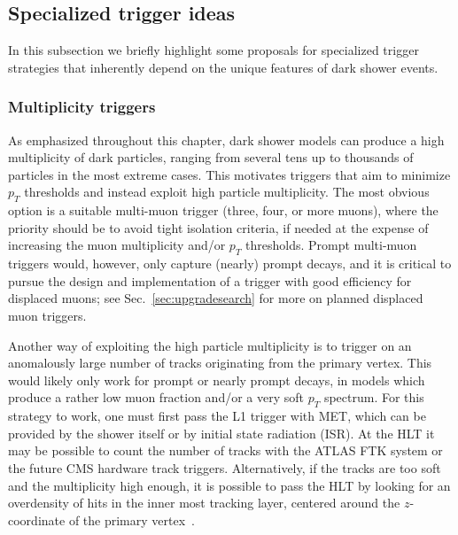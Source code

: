 \begin{enumerate}
\begin{enumerate}
\end{enumerate}



\subsection{Specialized trigger ideas}

In this subsection we briefly highlight some proposals for specialized trigger strategies that inherently depend on the unique features of dark shower events.


\subsubsection{Multiplicity triggers}
\label{sec:darkshowertrigmultiplicity}

As emphasized  throughout this chapter, dark shower models can produce a high multiplicity of dark particles, ranging from several tens up to thousands of particles in the most extreme cases. This motivates triggers that aim to minimize $p_T$ thresholds and instead exploit high particle multiplicity. The most obvious option is a suitable multi-muon trigger (three, four, or more muons), where the priority should be to avoid tight isolation criteria, if needed at the expense of increasing the muon multiplicity and/or $p_T$ thresholds. Prompt multi-muon triggers would, however, only capture (nearly) prompt decays, and it is critical to pursue the design and implementation of a trigger with good efficiency for displaced muons; see Sec.~\ref{sec:upgradesearch} for more on planned displaced muon triggers.


Another way of exploiting the high particle multiplicity is to trigger on an anomalously large number of tracks originating from the primary vertex. This would likely only work for prompt or nearly prompt decays, in models which produce a rather low muon fraction and/or a very soft $p_T$ spectrum. For this strategy to work, one must first pass the L1 trigger with MET, which can be provided by the shower itself or by initial state radiation (ISR). At the HLT it may be possible to count the number of tracks with the ATLAS FTK system or the future CMS hardware track triggers. Alternatively, if the tracks are too soft and the multiplicity high enough, it is possible to pass the HLT  by looking for an overdensity of hits in the inner most tracking layer, centered around the $z$-coordinate of the primary vertex~\cite{Knapen:2016hky}.


\end{enumerate}
